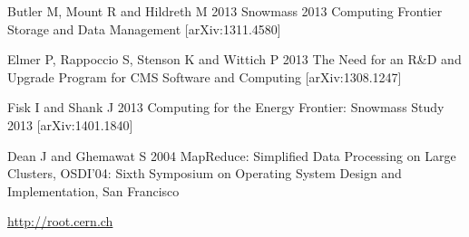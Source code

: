 \documentclass[a4paper]{jpconf}
\begin{document}
\begin{thebibliography}{9}
 Butler M, Mount R and Hildreth M 2013 Snowmass
  2013 Computing Frontier Storage and Data Management
  [arXiv:1311.4580]

 Elmer P, Rappoccio S, Stenson K and Wittich P 2013
  The Need for an R\&D and Upgrade Program for CMS Software and
  Computing [arXiv:1308.1247]

 Fisk I and Shank J 2013 Computing for the Energy
  Frontier: Snowmass Study 2013 [arXiv:1401.1840]

 Dean J and Ghemawat S 2004 MapReduce: Simplified Data Processing on Large Clusters, OSDI'04: Sixth Symposium on Operating System Design
and Implementation, San Francisco

 \url{http://root.cern.ch}

\end{thebibliography}
\end{document}
